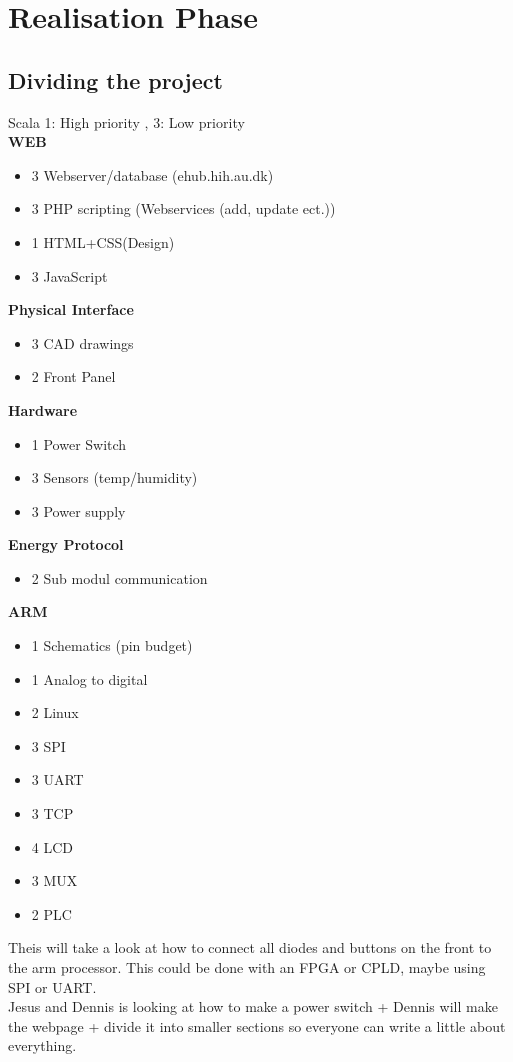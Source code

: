 \chapter{Realisation Phase}
\section{Dividing the project}
Scala 1: High priority , 3: Low priority\\
\textbf{WEB}
\begin{itemize}
	\item 3 Webserver/database (ehub.hih.au.dk)
	\item 3 PHP scripting (Webservices (add, update ect.))
	\item 1 HTML+CSS(Design)
	\item 3 JavaScript
\end{itemize}

\textbf{Physical Interface}
\begin{itemize}
	\item 3 CAD drawings
	\item 2 Front Panel
\end{itemize}

\textbf{Hardware}
\begin{itemize}
	\item 1 Power Switch
	\item 3 Sensors (temp/humidity)
	\item 3 Power supply
\end{itemize}

\textbf{Energy Protocol}
\begin{itemize}
	\item 2 Sub modul communication
\end{itemize}

\textbf{ARM}
\begin{itemize}
	\item 1 Schematics (pin budget)
	\item 1 Analog to digital
	\item 2 Linux
	\item 3 SPI
	\item 3 UART
	\item 3 TCP
	\item 4 LCD
	\item 3 MUX
	\item 2 PLC
\end{itemize}

Theis will take a look at how to connect all diodes and buttons on the front to the arm processor.
This could be done with an FPGA or CPLD, maybe using SPI or UART.
\\
Jesus and Dennis is looking at how to make a power switch + Dennis will make the webpage
+ divide it into smaller sections so everyone can write a little about everything.
